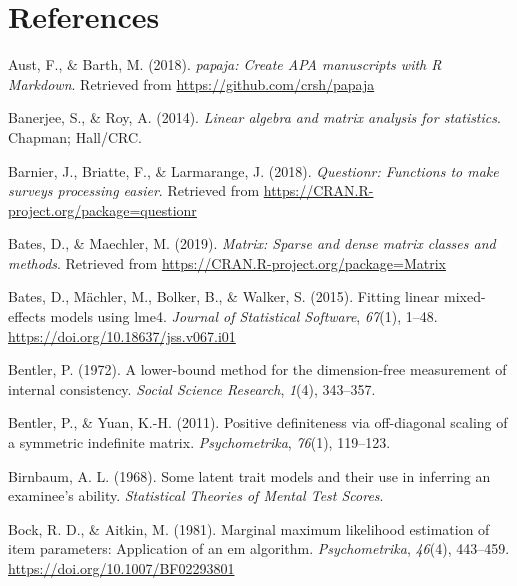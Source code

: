 \documentclass[
  english,
  man]{apa6}
\begin{document}
\newpage

\hypertarget{references}{%
\section{References}\label{references}}

\begingroup
\setlength{\parindent}{-0.5in}
\setlength{\leftskip}{0.5in}

\hypertarget{refs}{}
\leavevmode\hypertarget{ref-R-papaja}{}%
Aust, F., \& Barth, M. (2018). \emph{papaja: Create APA manuscripts with R Markdown}. Retrieved from \url{https://github.com/crsh/papaja}

\leavevmode\hypertarget{ref-banerjee2014}{}%
Banerjee, S., \& Roy, A. (2014). \emph{Linear algebra and matrix analysis for statistics}. Chapman; Hall/CRC.

\leavevmode\hypertarget{ref-R-questionr}{}%
Barnier, J., Briatte, F., \& Larmarange, J. (2018). \emph{Questionr: Functions to make surveys processing easier}. Retrieved from \url{https://CRAN.R-project.org/package=questionr}

\leavevmode\hypertarget{ref-R-Matrix}{}%
Bates, D., \& Maechler, M. (2019). \emph{Matrix: Sparse and dense matrix classes and methods}. Retrieved from \url{https://CRAN.R-project.org/package=Matrix}

\leavevmode\hypertarget{ref-R-lme4}{}%
Bates, D., Mächler, M., Bolker, B., \& Walker, S. (2015). Fitting linear mixed-effects models using lme4. \emph{Journal of Statistical Software}, \emph{67}(1), 1--48. \url{https://doi.org/10.18637/jss.v067.i01}

\leavevmode\hypertarget{ref-bentler1972}{}%
Bentler, P. (1972). A lower-bound method for the dimension-free measurement of internal consistency. \emph{Social Science Research}, \emph{1}(4), 343--357.

\leavevmode\hypertarget{ref-bentler2011}{}%
Bentler, P., \& Yuan, K.-H. (2011). Positive definiteness via off-diagonal scaling of a symmetric indefinite matrix. \emph{Psychometrika}, \emph{76}(1), 119--123.

\leavevmode\hypertarget{ref-birnbaum1968some}{}%
Birnbaum, A. L. (1968). Some latent trait models and their use in inferring an examinee's ability. \emph{Statistical Theories of Mental Test Scores}.

\leavevmode\hypertarget{ref-bock1981}{}%
Bock, R. D., \& Aitkin, M. (1981). Marginal maximum likelihood estimation of item parameters: Application of an em algorithm. \emph{Psychometrika}, \emph{46}(4), 443--459. \url{https://doi.org/10.1007/BF02293801}
\end{document}
